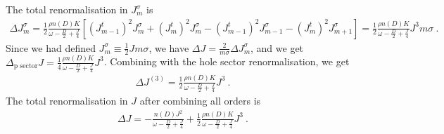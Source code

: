 \documentclass[reprint,onecolumn,prb,superscriptaddress]{revtex4-2}
\begin{document}
The total renormalisation in  \(J^\sigma_m\) is
\begin{equation}\begin{aligned}
	\Delta J^\sigma_m = \frac{1}{2}\frac{\rho n(D) K}{\omega - \frac{D}{2} + \frac{J}{4}}\left[\left( J^t_{m-1} \right)^2 J^\sigma_m + \left( J^t_m \right)^2 J^\sigma_m - \left( J^t_{m-1} \right)^2 J^\sigma_{m-1} - \left(J^t_m\right)^2 J^\sigma_{m+1} \right] = \frac{1}{2}\frac{\rho n(D) K}{\omega - \frac{D}{2} + \frac{J}{4}}J^3 m \sigma~.
\end{aligned}\end{equation}
Since we had defined \(J^\sigma_m \equiv \frac{1}{2}J m \sigma\), we have \(\Delta J = \frac{2}{m\sigma}\Delta J^\sigma_m\), and we get \(\Delta_\text{p sector} J = \frac{1}{4}\frac{\rho n(D) K}{\omega - \frac{D}{2} + \frac{J}{4}}J^3\).
Combining with the hole sector renormalisation, we get
\begin{equation}\begin{aligned}
	\Delta J^{(3)} = \frac{1}{2}\frac{\rho n(D) K}{\omega - \frac{D}{2} + \frac{J}{4}}J^3~.
\end{aligned}\end{equation}
The total renormalisation in \(J\) after combining all orders is
\begin{equation}\begin{aligned}
	\Delta J = -\frac{n(D) J^2}{\omega - \frac{D}{2} + \frac{J}{4}} + \frac{1}{2}\frac{\rho n(D) K}{\omega - \frac{D}{2} + \frac{J}{4}}J^3~.
\end{aligned}\end{equation}



\end{document}
